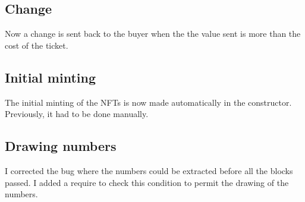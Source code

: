 \documentclass[11pt]{article}
\begin{document}
\subsection*{Change}
Now a change is sent back to the buyer when the the value sent is more than the cost of the ticket.
\subsection*{Initial minting}
The initial minting  of the NFTs is now made automatically in the constructor. Previously, it had to be done manually.
\subsection*{Drawing numbers}
I corrected the bug where the numbers could be extracted before all the blocks passed.
I added a require to check this condition to permit the drawing of the numbers.
\end{document}
